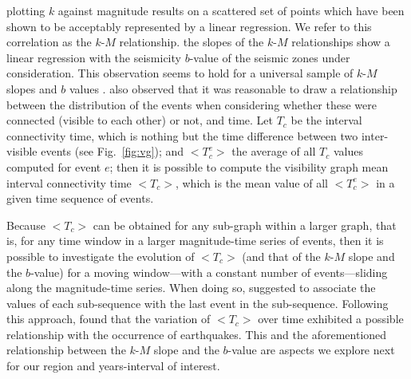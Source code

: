 
 plotting $k$ against magnitude results on a scattered set of points which have been shown to be acceptably represented by a linear regression. We refer to this correlation as the $k$-$M$ relationship.  the slopes of the $k$-$M$ relationships show a linear regression with the seismicity $b$-value of the seismic zones under consideration. {This observation seems to hold} for a universal sample of $k$-$M$ slopes and $b$ values  \citet{Telesca2013, Telesca2014}. \citet{Telesca2014} also observed that it was reasonable to draw a relationship between the distribution of the events when considering whether these were connected (visible to each other) or not, and time. Let $T_c$ be the interval connectivity time, which is nothing but the time difference between two inter-visible events (see Fig.~\ref{fig:vg}); and $<$$T_c^e$$>$ the average of all $T_c$ values computed for event $e$; then it is possible to compute the visibility graph mean interval connectivity time $<$$T_c$$>$, which is the mean value of all $<$$T_c^e$$>$ in a given time sequence of events.

Because $<$$T_c$$>$ can be obtained for any sub-graph within a larger graph, that is, for any time window in a larger magnitude-time series of events, then it is possible to investigate the evolution of $<$$T_c$$>$ (and that of the $k$-$M$ slope and the $b$-value) for a moving window---with a constant number of events---sliding along the magnitude-time series. When doing so, \citet{Telesca2016} suggested to associate the values of each sub-sequence with the last event in the sub-sequence. Following this approach, \citet{Telesca2016} found that the variation of $<$$T_c$$>$ over time exhibited a possible relationship with the occurrence of earthquakes. This and the aforementioned relationship between the $k$-$M$ slope and the $b$-value are aspects we explore next for our region and years-interval of interest.

